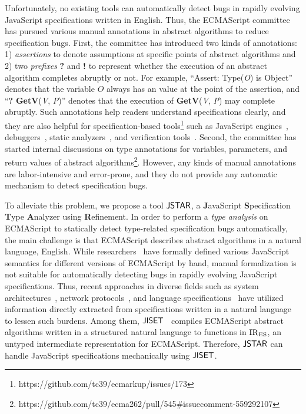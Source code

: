Unfortunately, no existing tools can automatically detect bugs in
rapidly evolving JavaScript specifications written in English. Thus,
the ECMAScript committee has pursued various manual annotations in
abstract algorithms to reduce specification bugs.
First, the committee has introduced two kinds of annotations: 1)
\textit{assertions} to denote assumptions at specific points of abstract
algorithms and 2) two \textit{prefixes} \textbf{?} and \textbf{!} to
represent whether the execution of an abstract algorithm completes
abruptly or not. For example, ``Assert: Type(\textit{O}) is Object'' denotes that
the variable $\textit{O}$ always has an  value at the
point of the assertion, and ``\textbf{?} \textbf{GetV}(\textit{V}, \textit{P})'' denotes that
the execution of \textbf{GetV}(\textit{V}, \textit{P}) may complete abruptly.
Such annotations help readers understand specifications clearly, and
they are also helpful for specification-based
tools\footnote{https://github.com/tc39/ecmarkup/issues/173} such as JavaScript
engines~\cite{v8, graaljs, qjs, moddable}, debuggers~\cite{jsexplain}, static
analyzers~\cite{safe, tajs, jsai, wala}, and verification tools~\cite{javert,
javert2}.
Second, the committee has started internal discussions on type
annotations for variables, parameters, and return values of abstract
algorithms\footnote{https://github.com/tc39/ecma262/pull/545\#issuecomment-559292107}.
However, any kinds of manual annotations are labor-intensive and
error-prone, and they do not provide any automatic mechanism to detect
specification bugs.

To alleviate this problem, we propose a tool $\tool$, a \textbf{J}avaScript
\textbf{S}pecification \textbf{T}ype \textbf{A}nalyzer using
\textbf{R}efinement. In order to perform a \textit{type analysis} on ECMAScript
to statically detect type-related specification bugs automatically,
the main challenge is that ECMAScript describes abstract algorithms in
a natural language, English. While researchers~\cite{lambdajs, jscert, kjs}
have formally defined various JavaScript semantics for different
versions of ECMAScript by hand, manual formalization is not suitable for
automatically detecting bugs in rapidly evolving JavaScript specifications. 
Thus, recent approaches in diverse fields such as system architectures~\cite{x86, arm},
network protocols~\cite{basespec}, and language specifications~\cite{spectest, javadoc}
have utilized information directly extracted from specifications written in a natural language
to lessen such burdens.
Among them, $\jiset$~\cite{jiset} compiles ECMAScript abstract algorithms written in
a structured natural language to functions in ${\text{IR}_\text{ES}}$, an untyped
intermediate representation for ECMAScript.
Therefore, $\tool$ can handle JavaScript specifications mechanically using $\jiset$.


